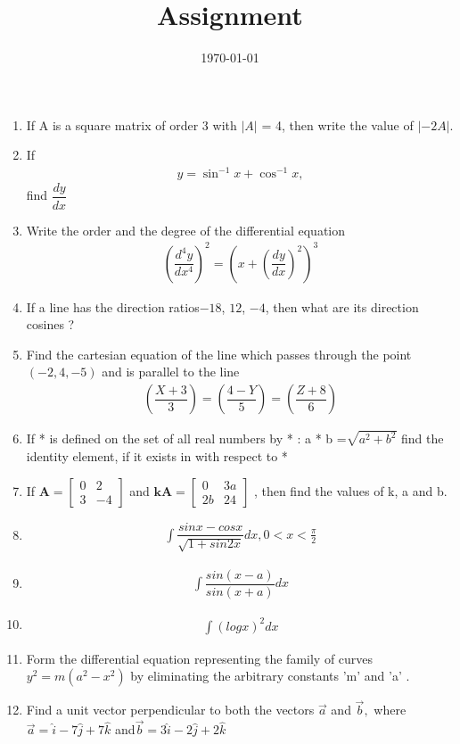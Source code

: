 \documentclass[12pt,-letter paper]{article}
\title{Assignment}
\date{\today}
\let\vec\mathbf{}
\let\vec\mathbf{}
\let\vec\mathbf{}
\providecommand{\myvec}[1]{\ensuremath{\begin{bmatrix}#1\end{bmatrix}}}
\providecommand{\brak}[1]{\ensuremath{\left(#1\right)}}
\begin{document}
\begin{enumerate}
\item If A is a square matrix of order 3 with $|A|$ = 4, then write the value of $|-2 A|$.
\item If
\begin{align}
    y = \sin ^{-1} {x} + \cos^{-1} {x},
\end{align}
 find $\dfrac{dy}{dx}$
\item Write the order and the degree of the differential equation
\begin{align}
    \brak{\dfrac{d^4y}{dx^4}}^2=\brak{x+\brak{\dfrac{dy}{dx}}^2}^3
\end{align}
\item If a line has the direction ratios$-18$, $12$, $-4$, then what are its direction
cosines ?
\item  Find the cartesian equation of the line which passes through the point $\brak{-2,4,-5}$ and is parallel to the line
\begin{align}
\brak{\dfrac{X+3}{3}}=\brak{\dfrac{4-Y}{5}}=\brak{\dfrac{Z+8}{6}}
\end{align}
\item If * is defined on the set of all real numbers by * : a * b =$ \sqrt {a^2+b^2}$ find the identity element, if it exists in with respect to *
\item If $\vec{A}=\myvec{0&2\\3&-4}$ and $\vec{kA}=\myvec{0&3a\\2b&24}$ , then find the values of k, a and b.
\item 
\begin{align}
\int {\dfrac{sin x-cos x}{\sqrt{1+sin 2x}}dx},0<x<\frac{\pi}{2}
\end{align}
\item
\begin{align}
\int{\dfrac{sin (x-a)}{sin(x+a)}}dx
\end{align}
\item 
\begin{align}
\int(log x)^2 dx 
\end{align}
\item Form the differential equation representing the family of curves $y^2=m(a^2-x^2)$ by eliminating the arbitrary constants 'm' and 'a' . 
\item Find a unit vector perpendicular to both the vectors $\overrightarrow{a}$ and $\overrightarrow{b},$ where$\overrightarrow{a}=\hat{i}-7\hat{j}+7\hat{k}$ and$\overrightarrow{b}=3\hat{i}-2\hat{j}+2\hat{k}$

\end{enumerate}
\end{document}
